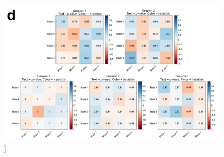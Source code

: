 \documentclass[phd,tocprelim]{cornell}
\renewcommand{\caption}[1]{\singlespacing\hangcaption{#1}\normalspacing}
\begin{document}
\null
\vfill
\clearpage
\null
\vfill
\begin{figure}[h!]
		\ContinuedFloat
		\captionsetup{labelformat=adja-page}
    \centering
    \includegraphics[width=1\textwidth]{chapter2/SupplementaryFig9d.png}
    \caption[]{}
\end{figure}
\null
\vfill
\clearpage
\null
\vfill
\end{document}
